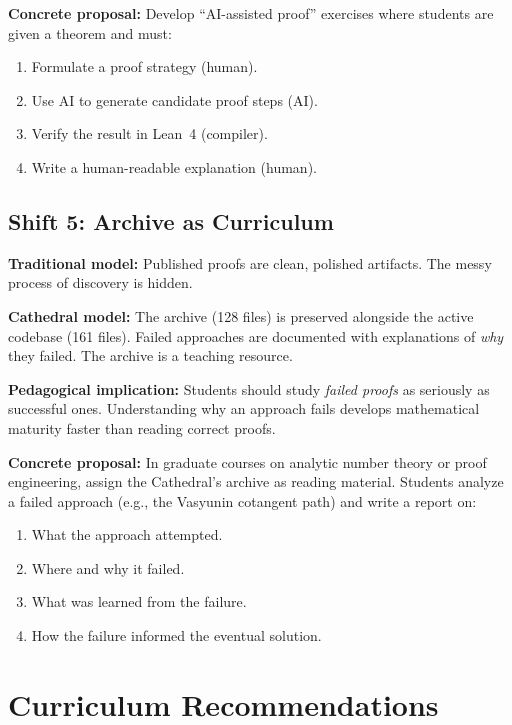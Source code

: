\documentclass[11pt,a4paper]{article}
\begin{document}
\textbf{Concrete proposal:} Develop ``AI-assisted proof'' exercises
where students are given a theorem and must:
\begin{enumerate}
  \item Formulate a proof strategy (human).
  \item Use AI to generate candidate proof steps (AI).
  \item Verify the result in Lean~4 (compiler).
  \item Write a human-readable explanation (human).
\end{enumerate}

\subsection{Shift 5: Archive as Curriculum}

\textbf{Traditional model:} Published proofs are clean, polished
artifacts. The messy process of discovery is hidden.

\textbf{Cathedral model:} The archive (128 files) is preserved
alongside the active codebase (161 files). Failed approaches are
documented with explanations of \emph{why} they failed. The
archive is a teaching resource.

\textbf{Pedagogical implication:} Students should study
\emph{failed proofs} as seriously as successful ones. Understanding
why an approach fails develops mathematical maturity faster than
reading correct proofs.

\textbf{Concrete proposal:} In graduate courses on analytic number
theory or proof engineering, assign the Cathedral's archive as
reading material. Students analyze a failed approach (e.g., the
Vasyunin cotangent path) and write a report on:
\begin{enumerate}
  \item What the approach attempted.
  \item Where and why it failed.
  \item What was learned from the failure.
  \item How the failure informed the eventual solution.
\end{enumerate}

\section{Curriculum Recommendations}
\end{document}
